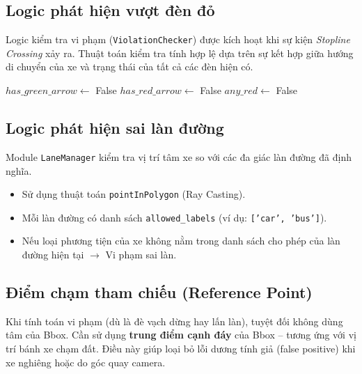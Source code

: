 \subsection{Logic phát hiện vượt đèn đỏ}
Logic kiểm tra vi phạm (\texttt{ViolationChecker}) được kích hoạt khi sự kiện \textit{Stopline Crossing} xảy ra. Thuật toán kiểm tra tính hợp lệ dựa trên sự kết hợp giữa hướng di chuyển của xe và trạng thái của tất cả các đèn hiện có.

\begin{algorithm}[!ht]
\SetAlgoLined
{}

$has\_green\_arrow \leftarrow$ False\;
$has\_red\_arrow \leftarrow$ False\;
$any\_red \leftarrow$ False\;


\caption{Logic kiểm tra vượt đèn đỏ}
\label{alg:violation_engine}
\end{algorithm}

\subsection{Logic phát hiện sai làn đường}
Module \texttt{LaneManager} kiểm tra vị trí tâm xe so với các đa giác làn đường đã định nghĩa.
\begin{itemize}
    \item Sử dụng thuật toán \texttt{pointInPolygon} (Ray Casting).
    \item Mỗi làn đường có danh sách \texttt{allowed\_labels} (ví dụ: \texttt{['car', 'bus']}).
    \item Nếu loại phương tiện của xe không nằm trong danh sách cho phép của làn đường hiện tại $\rightarrow$ Vi phạm sai làn.
\end{itemize}

\subsection{Điểm chạm tham chiếu (Reference Point)}
Khi tính toán vi phạm (dù là đè vạch dừng hay lấn làn), tuyệt đối không dùng tâm của Bbox. Cần sử dụng \textbf{trung điểm cạnh đáy} của Bbox – tương ứng với vị trí bánh xe chạm đất. Điều này giúp loại bỏ lỗi dương tính giả (false positive) khi xe nghiêng hoặc do góc quay camera.

